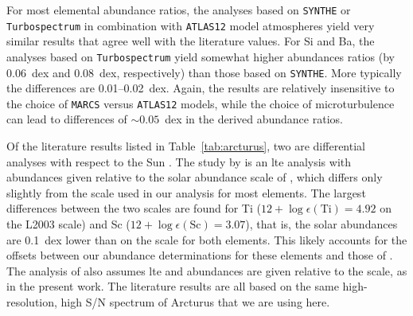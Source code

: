 \documentclass{aa}
\begin{document}
For most elemental abundance ratios, the analyses based on \texttt{SYNTHE} or \texttt{Turbospectrum} in combination with \texttt{ATLAS12} model atmospheres yield very similar results that agree well with the literature values. For Si and Ba, the analyses based on \texttt{Turbospectrum} yield somewhat higher abundances ratios (by 0.06~dex and 0.08~dex, respectively) than those based on \texttt{SYNTHE}. More typically the differences are 0.01--0.02~dex. 
Again, the results are relatively insensitive to the choice of \texttt{MARCS} versus \texttt{ATLAS12} models, while the choice of microturbulence can lead to differences of $\sim0.05$~dex in the derived abundance ratios. 

Of the literature results listed in Table~\ref{tab:arcturus}, two are differential analyses with respect to the Sun .
The study by  is an \ac{lte} analysis with abundances given relative to the solar abundance scale of \citet[][L2003]{Lodders2003}, which differs only slightly from the  scale used in our analysis for most elements.
The largest differences between the two scales are found for Ti ($12+\log \epsilon(\mathrm{Ti}) = 4.92$ on the L2003 scale) and Sc ($12+\log \epsilon(\mathrm{Sc}) = 3.07$), that is, the solar abundances are 0.1~dex lower than on the  scale for both elements. This likely accounts for the offsets between our abundance determinations for these elements and those of . The analysis of  also assumes \ac{lte} and abundances are given relative to the  scale, as in the present work. 
The literature results are all based on the same high-resolution, high S/N spectrum of Arcturus that we are using here. 
\end{document}
